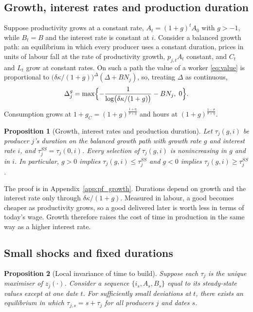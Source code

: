 \documentclass[11pt]{article}
\newtheorem{proposition}{Proposition}
\theoremstyle{definition}
\begin{document}
\subsection{Growth, interest rates and production duration}\label{sec:growth}

Suppose productivity grows at a constant rate, $A_t=(1+g)^tA_0$ with $g>-1$, while $B_t=B$ and
the interest rate is constant at $i$. Consider a balanced growth path: an equilibrium in which every
producer uses a constant duration, prices in units of labour fall at the rate of productivity growth,
$p_{j,t}A_t$ constant, and $C_t$ and $L_t$ grow at constant rates. On such a path the value of a worker
\eqref{eq:value} is proportional to $\bigl(\delta\kappa/(1+g)\bigr)^{\Delta}(\Delta+BN_j)$, so,
treating $\Delta$ as continuous,
\begin{equation}\label{eq:gdur}
  \Delta_j^{g}=\max\Bigl\{-\frac{1}{\log\bigl(\delta\kappa/(1+g)\bigr)}-BN_j,\;0\Bigr\} .
\end{equation}
Consumption grows at $1+g_C=(1+g)^{\frac{1+\eta}{\sigma+\eta}}$ and hours at
$(1+g)^{\frac{1-\sigma}{\sigma+\eta}}$.

\begin{proposition}[Growth, interest rates and production duration]\label{prop:growth}
Let $\tau_j(g,i)$ be producer $j$'s duration on the balanced growth path with growth rate $g$ and
interest rate $i$, and $\tau_j^{SS}=\tau_j(0,i)$. Every selection of $\tau_j(g,i)$ is nonincreasing in
$g$ and in $i$. In particular, $g>0$ implies $\tau_j(g,i)\le\tau_j^{SS}$ and $g<0$ implies
$\tau_j(g,i)\ge\tau_j^{SS}$.
\end{proposition}

\noindent The proof is in Appendix~\ref{app:pf_growth}. Durations depend on growth and the interest rate only
through $\delta\kappa/(1+g)$. Measured in labour, a good becomes cheaper as productivity grows, so a
good delivered later is worth less in terms of today's wage. Growth therefore raises the cost of time
in production in the same way as a higher interest rate.

\subsection{Small shocks and fixed durations}\label{sec:small}

\begin{proposition}[Local invariance of time to build]\label{prop:local}
Suppose each $\tau_j$ is the unique maximiser of $z_j(\cdot)$. Consider a sequence $\{i_s,A_s,B_s\}$
equal to its steady-state values except at one date $t$. For sufficiently small deviations at $t$,
there exists an equilibrium in which $\tau_{j,s}=s+\tau_j$ for all producers $j$ and dates $s$.
\end{proposition}
\end{document}
